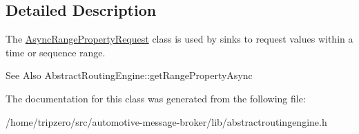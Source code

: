 \subsection{Detailed Description}
The \hyperlink{classAsyncRangePropertyRequest}{Async\-Range\-Property\-Request} class is used by sinks to request values within a time or sequence range. 

\begin{DoxySeeAlso}{See Also}
Abstract\-Routing\-Engine\-::get\-Range\-Property\-Async 
\end{DoxySeeAlso}


The documentation for this class was generated from the following file\-:\begin{DoxyCompactItemize}
\item 
/home/tripzero/src/automotive-\/message-\/broker/lib/abstractroutingengine.\-h\end{DoxyCompactItemize}
